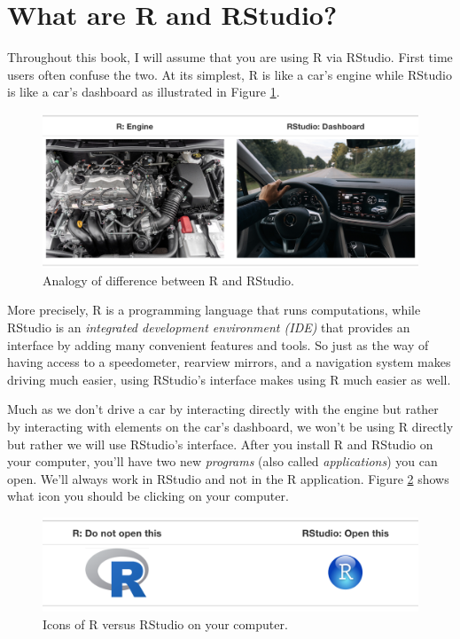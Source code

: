 \documentclass[
  12pt,
  oneside]{book}
\theoremstyle{definition}
\theoremstyle{definition}
\theoremstyle{definition}
\theoremstyle{definition}
\theoremstyle{remark}
\begin{document}
\hypertarget{r-rstudio}{%
\section{What are R and RStudio?}\label{r-rstudio}}

Throughout this book, I will assume that you are using R via RStudio. First time users often confuse the two. At its simplest, R is like a car's engine while RStudio is like a car's dashboard as illustrated in Figure \ref{fig:R-vs-RStudio-1}.

\begin{figure}
\includegraphics[width=0.95\linewidth]{fig/R_vs_RStudio_1} \caption{Analogy of difference between R and RStudio.}\label{fig:R-vs-RStudio-1}
\end{figure}

More precisely, R is a programming language that runs computations, while RStudio is an \emph{integrated development environment (IDE)} that provides an interface by adding many convenient features and tools. So just as the way of having access to a speedometer, rearview mirrors, and a navigation system makes driving much easier, using RStudio's interface makes using R much easier as well.

Much as we don't drive a car by interacting directly with the engine but rather by interacting with elements on the car's dashboard, we won't be using R directly but rather we will use RStudio's interface. After you install R and RStudio on your computer, you'll have two new \emph{programs} (also called \emph{applications}) you can open. We'll always work in RStudio and not in the R application. Figure \ref{fig:R-vs-RStudio-2a} shows what icon you should be clicking on your computer.

\begin{figure}
\includegraphics[width=0.9\linewidth]{fig/R_vs_RStudio} \caption{Icons of R versus RStudio on your computer.}\label{fig:R-vs-RStudio-2a}
\end{figure}
\end{document}
